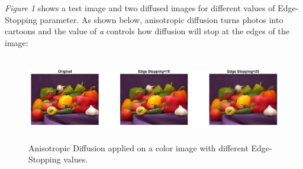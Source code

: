 \documentclass[a4paper,11pt]{article}
\begin{document}
\newpage

\emph{Figure 1} shows a test image and two diffused images for different values of Edge-Stopping parameter. As shown below, anisotropic diffusion turns photos into cartoons and the value of \emph{a} controls how diffusion will stop at the edges of the image:

\begin{figure}[!htb]
  \centering
  \includegraphics[width=16cm, height=3.7cm]{1.png}
  \caption{\small Anisotropic Diffusion applied on a color image with different Edge-Stopping values.}
\end{figure}
\end{document}
